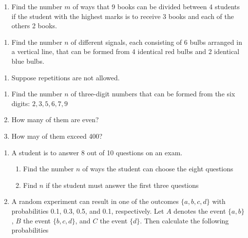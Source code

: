 \documentclass[]{book}
\providecommand{\tightlist}{%
  \setlength{\itemsep}{0pt}\setlength{\parskip}{0pt}}
\begin{document}
\begin{enumerate}
\def\labelenumi{\arabic{enumi}.}
\setcounter{enumi}{1}
\tightlist
\item
  Find the number \(m\) of ways that 9 books can be divided between 4 students if the student with the highest marks is to receive 3 books and each of the others 2 books.
\end{enumerate}

\begin{enumerate}
\def\labelenumi{\arabic{enumi}.}
\setcounter{enumi}{2}
\tightlist
\item
  Find the number \(n\) of different signals, each consisting of 6 bulbs arranged in a vertical line, that can be formed from 4 identical red bulbs and 2 identical blue bulbs.
\end{enumerate}

\begin{enumerate}
\def\labelenumi{\arabic{enumi}.}
\setcounter{enumi}{3}
\tightlist
\item
  Suppose repetitions are not allowed.
\end{enumerate}

\begin{enumerate}
\def\labelenumi{(\alph{enumi})}
\tightlist
\item
  Find the number \(n\) of three-digit numbers that can be formed from the six digits: \(2,3,5,6,7,9\)
\item
  How many of them are even?
\item
  How may of them exceed 400?
\end{enumerate}

\begin{enumerate}
\def\labelenumi{\arabic{enumi}.}
\setcounter{enumi}{4}
\item
  A student is to answer 8 out of 10 questions on an exam.

  \begin{enumerate}
  \def\labelenumii{(\alph{enumii})}
  \tightlist
  \item
    Find the number \(n\) of ways the student can choose the eight questions
  \item
    Find \(n\) if the student must answer the first three questions
  \end{enumerate}
\item
  A random experiment can result in one of the outcomes \(\{a, b, c, d\}\) with probabilities 0.1, 0.3, 0.5, and 0.1, respectively. Let \(A\) denotes the event \(\{a, b\}\), \(B\) the event \(\{b, c, d\}\), and \(C\) the event \(\{d\}\). Then calculate the following probabilities
\end{enumerate}
\end{document}
